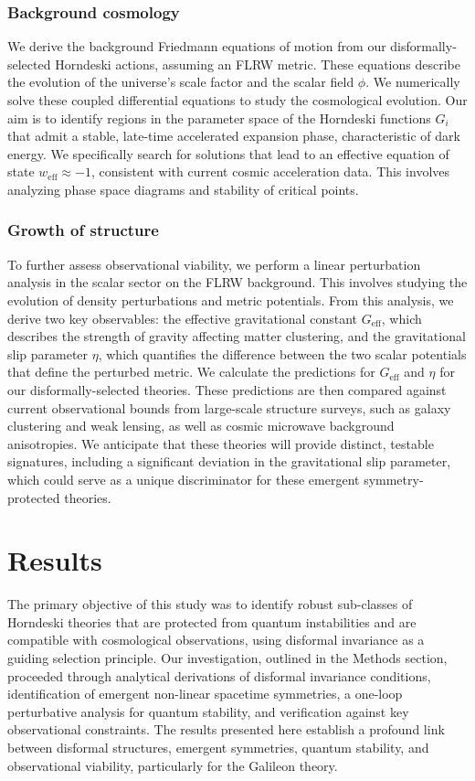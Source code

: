 \documentclass[twocolumn]{aastex631}
\begin{document}
\subsubsection{Background cosmology}
We derive the background Friedmann equations of motion from our disformally-selected Horndeski actions, assuming an FLRW metric. These equations describe the evolution of the universe's scale factor and the scalar field $\phi$. We numerically solve these coupled differential equations to study the cosmological evolution. Our aim is to identify regions in the parameter space of the Horndeski functions $G_i$ that admit a stable, late-time accelerated expansion phase, characteristic of dark energy. We specifically search for solutions that lead to an effective equation of state $w_{\text{eff}} \approx -1$, consistent with current cosmic acceleration data. This involves analyzing phase space diagrams and stability of critical points.

\subsubsection{Growth of structure}
To further assess observational viability, we perform a linear perturbation analysis in the scalar sector on the FLRW background. This involves studying the evolution of density perturbations and metric potentials. From this analysis, we derive two key observables: the effective gravitational constant $G_{\text{eff}}$, which describes the strength of gravity affecting matter clustering, and the gravitational slip parameter $\eta$, which quantifies the difference between the two scalar potentials that define the perturbed metric. We calculate the predictions for $G_{\text{eff}}$ and $\eta$ for our disformally-selected theories. These predictions are then compared against current observational bounds from large-scale structure surveys, such as galaxy clustering and weak lensing, as well as cosmic microwave background anisotropies. We anticipate that these theories will provide distinct, testable signatures, including a significant deviation in the gravitational slip parameter, which could serve as a unique discriminator for these emergent symmetry-protected theories.

\section{Results}
\label{sec:results}
The primary objective of this study was to identify robust sub-classes of Horndeski theories that are protected from quantum instabilities and are compatible with cosmological observations, using disformal invariance as a guiding selection principle. Our investigation, outlined in the Methods section, proceeded through analytical derivations of disformal invariance conditions, identification of emergent non-linear spacetime symmetries, a one-loop perturbative analysis for quantum stability, and verification against key observational constraints. The results presented here establish a profound link between disformal structures, emergent symmetries, quantum stability, and observational viability, particularly for the Galileon theory.
\end{document}
